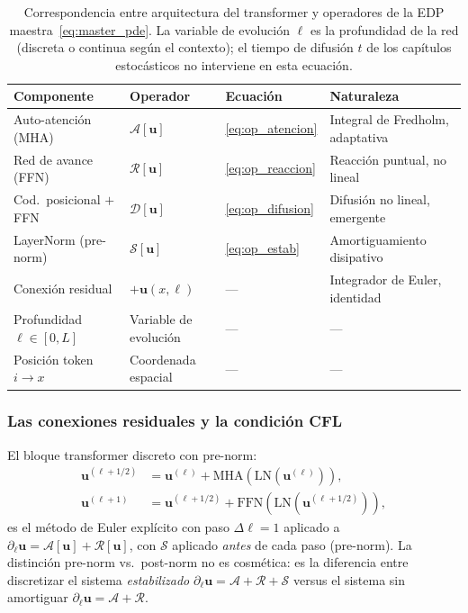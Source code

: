 \begin{table}[h]
\centering
\caption{Correspondencia entre arquitectura del transformer y
         operadores de la EDP maestra~\eqref{eq:master_pde}.
         La variable de evolución $\ell$ es la profundidad de
         la red (discreta o continua según el contexto);
         el tiempo de difusión $t$ de los capítulos estocásticos
         no interviene en esta ecuación.}
\label{tab:transformer_pde}
\small
\begin{tabular}{llll}
\toprule
\textbf{Componente} & \textbf{Operador} &
\textbf{Ecuación} & \textbf{Naturaleza} \\
\midrule
Auto-atención (MHA)
  & $\mathcal{A}[\bm{u}]$
  & \eqref{eq:op_atencion}
  & Integral de Fredholm, adaptativa \\
Red de avance (FFN)
  & $\mathcal{R}[\bm{u}]$
  & \eqref{eq:op_reaccion}
  & Reacción puntual, no lineal \\
Cod.\ posicional $+$ FFN
  & $\mathcal{D}[\bm{u}]$
  & \eqref{eq:op_difusion}
  & Difusión no lineal, emergente \\
LayerNorm (pre-norm)
  & $\mathcal{S}[\bm{u}]$
  & \eqref{eq:op_estab}
  & Amortiguamiento disipativo \\
Conexión residual
  & $+\bm{u}(x,\ell)$
  & —
  & Integrador de Euler, identidad \\
\midrule
Profundidad $\ell \in [0,L]$
  & Variable de evolución
  & — & — \\
Posición token $i \to x$
  & Coordenada espacial
  & — & — \\
\bottomrule
\end{tabular}
\end{table}

\subsubsection*{Las conexiones residuales y la condición CFL}

El bloque transformer discreto con pre-norm:
\begin{align}
  \bm{u}^{(\ell+1/2)}
    &= \bm{u}^{(\ell)}
     + \mathrm{MHA}\!\left(\mathrm{LN}(\bm{u}^{(\ell)})\right),
     \label{eq:bloque_a}\\
  \bm{u}^{(\ell+1)}
    &= \bm{u}^{(\ell+1/2)}
     + \mathrm{FFN}\!\left(\mathrm{LN}(\bm{u}^{(\ell+1/2)})\right),
     \label{eq:bloque_b}
\end{align}
es el método de Euler explícito con paso $\Delta\ell = 1$ aplicado
a $\partial_\ell\bm{u} = \mathcal{A}[\bm{u}] + \mathcal{R}[\bm{u}]$,
con $\mathcal{S}$ aplicado \emph{antes} de cada paso (pre-norm). La
distinción pre-norm vs.\ post-norm no es cosmética: es la diferencia
entre discretizar el sistema \emph{estabilizado}
$\partial_\ell\bm{u} = \mathcal{A} + \mathcal{R} + \mathcal{S}$
versus el sistema sin amortiguar
$\partial_\ell\bm{u} = \mathcal{A} + \mathcal{R}$.

